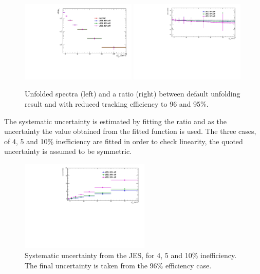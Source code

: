 \begin{figure}[bth]
\centering
\includegraphics[width=0.49\textwidth]{pPbplots/unfolding/jetSpectra_JESsys}
\includegraphics[width=0.49\textwidth]{pPbplots/unfolding/jetSpectraRatio_JESsys}
\caption{Unfolded spectra (left) and a ratio (right) between default unfolding result and with reduced tracking efficiency to 96 and 95\%.}
\label{fig:JESsys}
\end{figure}

The systematic uncertainty is estimated by fitting the ratio and as the uncertainty the value obtained from the fitted function is used. The three cases, of 4, 5 and 10\% inefficiency are fitted in order to check linearity, the quoted uncertainty is assumed to be symmetric. 

\begin{figure}[bth]
\centering
\includegraphics[width=0.55\textwidth]{pPbplots/unfolding/jetSpectraUncFit_JESsys}
\caption{Systematic uncertainty from the JES, for 4, 5 and 10\% inefficiency. The final uncertainty is taken from the 96\% efficiency case. }
\label{fig:JESsys}
\end{figure}

